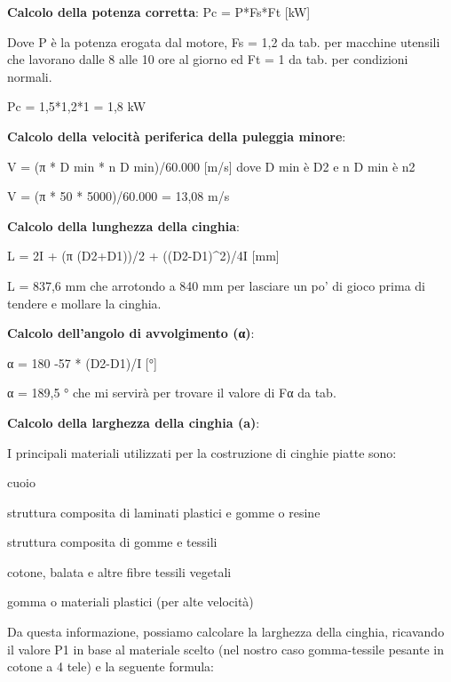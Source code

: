 \documentclass{report}
\begin{document}
\begin{description}

\item \textbf{Calcolo della potenza corretta}:
Pc = P*Fs*Ft [kW]

Dove P è la potenza erogata dal motore, Fs = 1,2 da tab. per macchine utensili che lavorano dalle 8 alle 10 ore al giorno ed Ft = 1 da tab. per condizioni normali.

Pc = 1,5*1,2*1 = 1,8 kW

\item \textbf{Calcolo della velocità periferica della puleggia minore}:

V = (π * D min * n D min)/60.000 [m/s] dove D min è D2 e n D min è n2

V = (π * 50 * 5000)/60.000 = 13,08 m/s

\item \textbf{Calcolo della lunghezza della cinghia}:

L = 2I + (π (D2+D1))/2 + ((D2-D1)^2)/4I [mm]

L = 837,6 mm che arrotondo a 840 mm per lasciare un po' di gioco prima di tendere e mollare la cinghia.


\item \textbf{Calcolo dell’angolo di avvolgimento (α)}:

α = 180 -57 * (D2-D1)/I [°]

α = 189,5 ° che mi servirà per trovare il valore di Fα da tab.

\item \textbf{Calcolo della larghezza della cinghia (a)}:

I principali materiali utilizzati per la costruzione di cinghie piatte sono:

    \begin{description}
    
    \item cuoio
    \item struttura composita di laminati plastici e gomme o resine
    \item struttura composita di gomme e tessili
    \item cotone, balata e altre fibre tessili vegetali
    \item gomma o materiali plastici (per alte velocità)
    
    \end{description}

Da questa informazione, possiamo calcolare la larghezza della cinghia, ricavando il valore P1 in base al materiale scelto (nel nostro caso gomma-tessile pesante in cotone a 4 tele) e la seguente formula:


\end{description}
\end{document}
